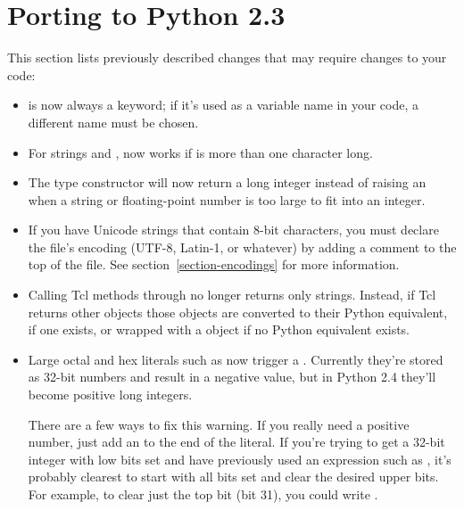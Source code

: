 \documentclass{howto}
\begin{document}
\section{Porting to Python 2.3}

This section lists previously described changes that may require
changes to your code:

\begin{itemize}

\item {} is now always a keyword; if it's used as a
variable name in your code, a different name must be chosen.

\item For strings  and ,  now works
if  is more than one character long.

\item The  type constructor will now return a long
integer instead of raising an  when a string
or floating-point number is too large to fit into an integer.

\item If you have Unicode strings that contain 8-bit characters, you
must declare the file's encoding (UTF-8, Latin-1, or whatever) by
adding a comment to the top of the file.  See
section~\ref{section-encodings} for more information.

\item Calling Tcl methods through  no longer 
returns only strings. Instead, if Tcl returns other objects those
objects are converted to their Python equivalent, if one exists, or
wrapped with a  object if no Python equivalent
exists.

\item Large octal and hex literals such as
 now trigger a . Currently
they're stored as 32-bit numbers and result in a negative value, but
in Python 2.4 they'll become positive long integers. 

There are a few ways to fix this warning.  If you really need a
positive number, just add an  to the end of the literal.  If
you're trying to get a 32-bit integer with low bits set and have
previously used an expression such as , it's probably
clearest to start with all bits set and clear the desired upper bits.
For example, to clear just the top bit (bit 31), you could write
.


\end{itemize}
\end{document}
